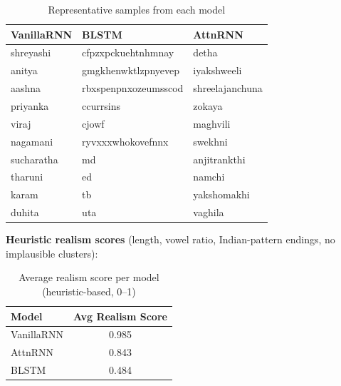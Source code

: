 \documentclass[11pt, a4paper]{article}
\begin{document}
\begin{table}[H]
\centering
\caption{Representative samples from each model}
\begin{tabular}{lll}
\toprule
\textbf{VanillaRNN} & \textbf{BLSTM} & \textbf{AttnRNN} \\
\midrule
shreyashi   & cfpzxpckuehtnhmnay  & detha \\
anitya      & gmgkhenwktlzpnyevep & iyakshweeli \\
aashna      & rbxspenpnxozeumsscod & shreelajanchuna \\
priyanka    & ccurrsins           & zokaya \\
viraj       & cjowf               & maghvili \\
nagamani    & ryvxxxwhokovefnnx   & swekhni \\
sucharatha  & md                  & anjitrankthi \\
tharuni     & ed                  & namchi \\
karam       & tb                  & yakshomakhi \\
duhita      & uta                 & vaghila \\
\bottomrule
\end{tabular}
\end{table}

\textbf{Heuristic realism scores} (length, vowel ratio, Indian-pattern endings, no implausible clusters):

\begin{table}[H]
\centering
\caption{Average realism score per model (heuristic-based, 0--1)}
\begin{tabular}{lc}
\toprule
\textbf{Model} & \textbf{Avg Realism Score} \\
\midrule
VanillaRNN & 0.985 \\
AttnRNN    & 0.843 \\
BLSTM      & 0.484 \\
\bottomrule
\end{tabular}
\end{table}
\end{document}
